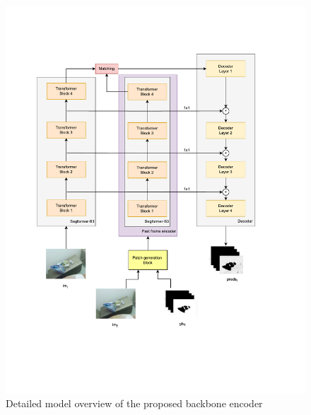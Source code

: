 \begin{figure}
    \centering
    \includegraphics[width=1.\linewidth, trim={ 1cm 4cm 2.5cm 2cm}]{figures/03_method/model_detailed_backbone.pdf}
    \caption{Detailed model overview of the proposed backbone encoder 
    }
   
    \label{fig:detailed_model_backbone}
\end{figure}



